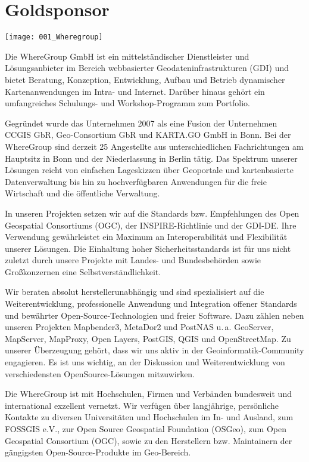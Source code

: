 \section*{Goldsponsor}
\begin{center}
	\texttt{[image: 001\_Wheregroup]}
\end{center}
Die WhereGroup GmbH ist ein mittelständischer Dienst\-leister und Lösungsanbieter im Bereich 
webbasierter Geodateninfrastrukturen (GDI) und bietet Beratung, Konzeption, Entwicklung, 
Aufbau und Betrieb dynamischer Kartenanwendungen im Intra- und Internet. Da\-rüber 
hinaus gehört ein umfangreiches Schulungs- und Workshop-Pro\-gramm zum Portfolio.

Gegründet wurde das Unternehmen 2007 als eine Fusion der Unternehmen CCGIS GbR, 
Geo-Consortium GbR und KARTA.GO GmbH in Bonn. Bei der WhereGroup sind derzeit 25 
Angestellte aus unterschiedlichen Fachrichtungen am Hauptsitz in Bonn und der Niederlassung in Berlin tätig. 
Das Spektrum unserer Lösungen reicht von einfachen Lageskizzen über Geoportale und 
kartenbasierte Datenverwaltung bis hin zu hochverfügbaren Anwendungen für die freie 
Wirtschaft und die öffentliche Verwaltung. 

In unseren Projekten setzen wir auf die Standards bzw. Empfehlungen des Open Geospatial 
Consortiums (OGC), der INSPIRE-Richtlinie und der GDI-DE. Ihre Verwendung gewährleistet 
ein Maximum an Interoperabilität und Flexibilität unserer Lösungen. Die Einhaltung hoher 
Sicherheitsstandards ist für uns nicht zuletzt durch unsere Projekte mit Landes- und 
Bundesbehörden sowie Großkonzernen eine Selbstverständlichkeit.

Wir beraten absolut herstellerunabhängig und sind spe\-zialisiert auf die Weiter\-ent\-wicklung, professionelle Anwendung 
und Integration offener Standards und bewährter Open-Source-Technologien und 
freier Software. Dazu zäh\-len neben unseren Projekten Mapbender3, MetaDor2 und PostNAS u.\,a. 
GeoServer, MapServer, Map\-Proxy, Open Lay\-ers, PostGIS, QGIS und OpenStreetMap.
Zu unserer Überzeugung gehört, dass wir uns aktiv in der Geoinfor\-matik-Community engagieren. 
Es ist uns wichtig, an der Diskussion und Weiterentwicklung von verschiedensten Open\-Source-Lösungen mitzuwirken.

Die WhereGroup ist mit Hochschulen, Firmen und Verbänden bundesweit und international exzellent 
vernetzt. Wir verfügen über langjährige, persönliche Kontakte zu diversen Universitäten und 
Hochschulen im In- und Ausland, zum FOSSGIS e.V., zur Open Source Geospatial Foundation (OSGeo), 
zum Open Geospatial Consortium (OGC), sowie zu den Herstellern bzw. Maintainern der gängigsten 
Open-Source-Produkte im Geo-Bereich.
